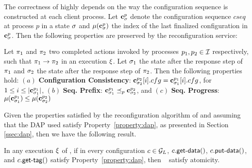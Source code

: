 The correctness of \ares{} highly depends on the way the configuration 
sequence is constructed at each client process. Let $\mathbf{c}^{p}_{\sigma}$ 
denote the configuration sequence $cseq$ at process $p$ in a state $\sigma$ and 
$\mu(\mathbf{c}^{p}_{\sigma})$ the index of the last finalized configuration in $\mathbf{c}^{p}_{\sigma}$. 
Then the following properties are preserved by the reconfiguration service:

\begin{theorem}
	Let $\pi_1$ and $\pi_2$ two 
	completed  actions invoked by processes $p_1, p_2\in\mathcal{I}$ 
	respectively, such that $\pi_1\rightarrow\pi_2$ in an execution $\EX$. 
	Let $\sigma_1$ the state after the response 
	step of $\pi_1$ and $\sigma_2$ the state after the response step 
	of $\pi_2$.
	Then the following properties hold: 
		$(a)$ \textbf{Configuration Consistency}: 
		$\mathbf{c}^{p_2}_{\sigma_2}[i].cfg = \mathbf{c}^{p_1}_{\sigma_1}[i].cfg$,  for $ 1 \leq i \leq |\mathbf{c}^{p_1}_{\sigma_1}|$,
		$(b)$  
		\textbf{Seq. Prefix}: $\mathbf{c}^{p_1}_{\sigma_1}  \preceq_p \mathbf{c}^{p_2}_{\sigma_2}$, and
		$(c)$  
		\textbf{Seq. Progress}: $\mu(\mathbf{c}^{p_1}_{\sigma_1}) \leq \mu(\mathbf{c}^{p_2}_{\sigma_2})$
\end{theorem}

Given the properties satisfied by the reconfiguration algorithm of \ares{} 
and assuming that the DAP used satisfy Property~\ref{property:dap}, as presented
in Section \ref{ssec:dap}, then  we have the following result. 

\begin{theorem}[Atomicity]
	In  any execution $\EX$ of \ares{}, if in every configuration $c\in{\mathcal{G}_L}$,
	$\dagetdata{c}$, $\daputdata{c}{}$, and $\dagettag{c}$
	 satisfy Property~\ref{property:dap}, then ~\ares{} satisfy atomicity.
\end{theorem}


